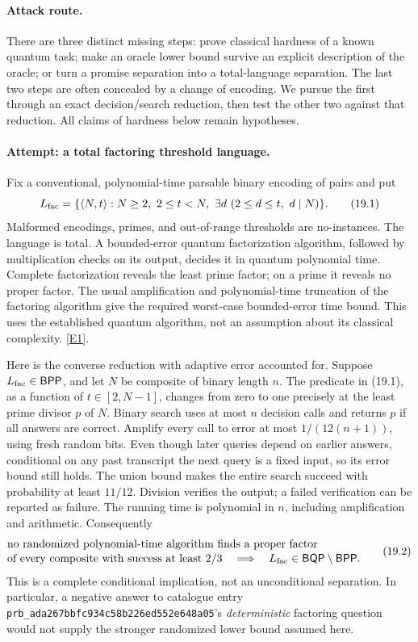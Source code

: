 \documentclass[11pt,a4paper]{article}
\newcommand{\eref}[2]{\hyperlink{extra:#1:#2}{[E#2]}}
\begin{document}
\paragraph{Attack route.}
There are three distinct missing steps: prove classical hardness of a known
quantum task; make an oracle lower bound survive an explicit description of
the oracle; or turn a promise separation into a total-language separation.
The last two steps are often concealed by a change of encoding. We pursue
the first through an exact decision/search reduction, then test the other
two against that reduction. All claims of hardness below remain hypotheses.

\paragraph{Attempt: a total factoring threshold language.}
Fix a conventional, polynomial-time parsable binary encoding of pairs and
put
\[
 L_{\rm fac}=\{\langle N,t\rangle:N\geq2,\ 2\leq t<N,
                  \ \exists d\ (2\leq d\leq t,\ d\mid N)\}.
 \tag{19.1}
\]
Malformed encodings, primes, and out-of-range thresholds are no-instances.
The language is total. A bounded-error quantum factorization algorithm,
followed by multiplication checks on its output, decides it in quantum
polynomial time. Complete factorization reveals the least prime factor;
on a prime it reveals no proper factor. The usual amplification and
polynomial-time truncation of the factoring algorithm give the required
worst-case bounded-error time bound. This uses the established quantum
algorithm, not an assumption about its classical complexity. \eref{statement}{1}.

Here is the converse reduction with adaptive error accounted for. Suppose
$L_{\rm fac}\in\mathsf{BPP}$, and let $N$ be composite of binary length $n$.
The predicate in (19.1), as a function of $t\in[2,N-1]$, changes from zero
to one precisely at the least prime divisor $p$ of $N$. Binary search uses
at most $n$ decision calls and returns $p$ if all answers are correct.
Amplify every call to error at most $1/(12(n+1))$, using fresh random bits.
Even though later queries depend on earlier answers, conditional on any
past transcript the next query is a fixed input, so its error bound still
holds. The union bound makes the entire search succeed with probability
at least $11/12$. Division verifies the output; a failed verification can
be reported as failure. The running time is polynomial in $n$, including
amplification and arithmetic. Consequently
\[
 \begin{split}
 &\text{no randomized polynomial-time algorithm finds a proper factor}\\[-2pt]
 &\text{of every composite with success at least }2/3
 \quad\Longrightarrow\quad
 L_{\rm fac}\in\mathsf{BQP}\setminus\mathsf{BPP}.
 \end{split}
 \tag{19.2}
\]
This is a complete conditional implication, not an unconditional
separation. In particular, a negative answer to catalogue entry \texttt{prb\_ada267bbfc934c58b226ed552e648a05}'s
\emph{deterministic} factoring question would not supply the stronger
randomized lower bound assumed here.
\end{document}
